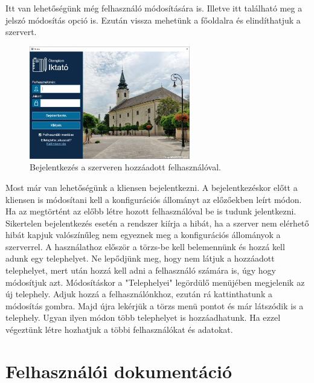 \documentclass[
]{thesis-ekf}
\theoremstyle{definition}
\theoremstyle{remark}
\begin{document}
Itt van lehetőségünk még felhasználó módosítására is. Illetve itt található meg a jelszó módosítás opció is. Ezután vissza mehetünk a főoldalra és elindíthatjuk a szervert.
\begin{figure}[!h]
	\centering
	\includegraphics[width=7cm]{dokukepek/clogin}
	\caption{Bejelentkezés a szerveren hozzáadott felhasználóval.}
	\label{fig:clogin}
\end{figure} 
Most már van lehetőségünk a kliensen bejelentkezni. A bejelentkezéskor előtt a kliensen is módosítani kell a konfigurációs állományt az előzőekben leírt módon. 
Ha az megtörtént az előbb létre hozott felhasználóval be is tudunk jelentkezni. Sikertelen bejelentkezés esetén a rendszer kiírja a hibát, ha a szerver nem elérhető hibát kapjuk valószínűleg nem egyeznek meg a konfigurációs állományok a szerverrel. A használathoz először a törzs-be kell belemennünk és hozzá kell adunk egy telephelyet. Ne lepődjünk meg, hogy nem látjuk a hozzáadott telephelyet, mert után hozzá kell adni a felhasználó számára is, úgy hogy módosítjuk azt. Módosításkor a "Telephelyei" legördülő menüjében megjelenik az új telephely. Adjuk hozzá a felhasználónkhoz, ezután rá kattinthatunk a módosítás gombra. Majd újra lekérjük a törzs menü pontot és már látszódik is a telephely. Ugyan ilyen módon több telephelyet is hozzáadhatunk. Ha ezzel végeztünk létre hozhatjuk a többi felhasználókat és adatokat.
\section{Felhasználói dokumentáció}
\end{document}
